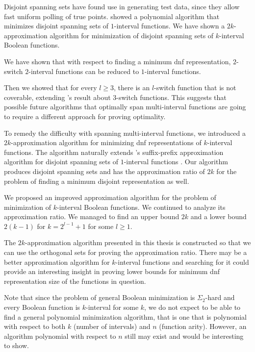 Disjoint spanning sets have found use in generating test data,
since they allow fast uniform polling of true points.
\citeauthor{Schieber2005154} showed
a polynomial algorithm that minimizes
disjoint spanning sets
of $1$-interval functions.
We have shown a $2k$-approximation algorithm
for minimization of disjoint spanning sets of $k$-interval Boolean functions.


We have shown that
with respect to finding
a minimum \acrshort{dnf} representation,
$2$-switch $2$-interval functions
can be reduced to $1$-interval functions.

Then we showed that for every $l \geq 3$,
there is an $l$-switch function that is not coverable,
extending \citeauthor{Dubovsky2012}'s result
about $3$-switch functions.
This suggests that possible future algorithms
that optimally span multi-interval functions
are going to require a different approach
for proving optimality.

To remedy the difficulty with spanning multi-interval
functions,
we introduced a $2k$-approximation algorithm
for minimizing \acrshort{dnf} representations
of $k$-interval functions.
The algorithm naturally extends
\citeauthor{Schieber2005154}'s suffix-prefix
approximation algorithm
for disjoint spanning sets of $1$-interval functions
\citep[section 6]{Schieber2005154}.
Our algorithm produces disjoint spanning sets
and has the approximation ratio of $2k$
for the problem of finding
a minimum disjoint representation as well.

We proposed an improved approximation algorithm for the problem of minimization of $k$-interval Boolean functions.
We continued to analyze its approximation ratio.
We managed to find an upper bound $2k$ and a lower bound $2(k-1)$
for $k = 2^{l-1}+1$ for some $l \geq 1$.

The $2k$-approximation algorithm presented in this thesis
is constructed so that we can use the orthogonal sets
for proving the approximation ratio.
There may be a better approximation algorithm
for $k$-interval functions
and searching for it could provide an interesting insight
in proving lower bounds for minimum \acrshort{dnf}
representation size of the functions in question.


Note that since the problem
of general Boolean minimization
is $\Sigma_2$-hard \citep{Umans1998}
and every Boolean function is $k$-interval for some $k$,
we do not expect to be able to find
a general polynomial minimization algorithm,
that is one that is polynomial
with respect to both $k$ (number of intervals) and $n$ (function arity).
However,
an algorithm polynomial with respect to $n$ still may exist and would be interesting to show.
